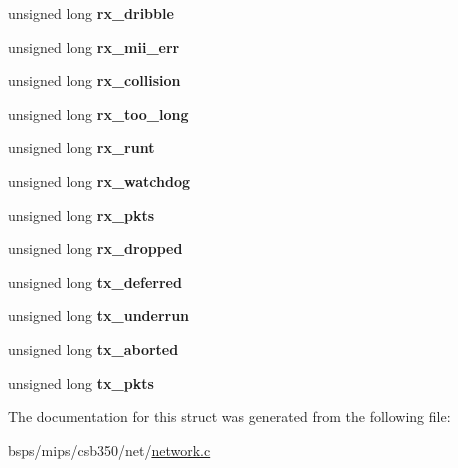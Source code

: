 \begin{DoxyCompactItemize}
unsigned long {\bfseries rx\+\_\+dribble}
\item 
\mbox{\label{structau1x00__emac__softc__t_adb9d075abab09079f661e37c004ea706}} 
unsigned long {\bfseries rx\+\_\+mii\+\_\+err}
\item 
\mbox{\label{structau1x00__emac__softc__t_a1339e09beccdf89033492450f4078186}} 
unsigned long {\bfseries rx\+\_\+collision}
\item 
\mbox{\label{structau1x00__emac__softc__t_a7a1d5d4e13315d603b6d0cd6ec85169b}} 
unsigned long {\bfseries rx\+\_\+too\+\_\+long}
\item 
\mbox{\label{structau1x00__emac__softc__t_a1a1423ae20f977f75c964d59aee7f7fc}} 
unsigned long {\bfseries rx\+\_\+runt}
\item 
\mbox{\label{structau1x00__emac__softc__t_a88627f820d799d8bc3c69e5df8936366}} 
unsigned long {\bfseries rx\+\_\+watchdog}
\item 
\mbox{\label{structau1x00__emac__softc__t_a0849bfb5ac3188aabc00992014663f44}} 
unsigned long {\bfseries rx\+\_\+pkts}
\item 
\mbox{\label{structau1x00__emac__softc__t_ab00e3148546fdd9b8e38596d85e900c0}} 
unsigned long {\bfseries rx\+\_\+dropped}
\item 
\mbox{\label{structau1x00__emac__softc__t_a909ef58d3737eb63870e26d6ebd872ee}} 
unsigned long {\bfseries tx\+\_\+deferred}
\item 
\mbox{\label{structau1x00__emac__softc__t_ac21432edcc7eb93b2664b8c7bba63b2b}} 
unsigned long {\bfseries tx\+\_\+underrun}
\item 
\mbox{\label{structau1x00__emac__softc__t_a29678986787de2084a11908c5af39a52}} 
unsigned long {\bfseries tx\+\_\+aborted}
\item 
\mbox{\label{structau1x00__emac__softc__t_a43afebb4f05823ae1391698af2b9aeeb}} 
unsigned long {\bfseries tx\+\_\+pkts}
\end{DoxyCompactItemize}


The documentation for this struct was generated from the following file\+:\begin{DoxyCompactItemize}
\item 
bsps/mips/csb350/net/\mbox{\hyperlink{mips_2csb350_2net_2network_8c}{network.\+c}}\end{DoxyCompactItemize}
